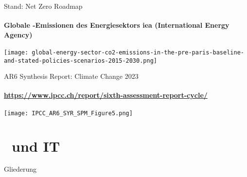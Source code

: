 		
\begin{frame}{Stand: Net Zero Roadmap}
	\framesubtitle{Globale \COz-Emissionen des Energiesektors \hspace*{\fill}
	                 iea (International Energy Agency)\cite{iea_net_zero2023}}
	
	
	\centering
	\texttt{[image: global-energy-sector-co2-emissions-in-the-pre-paris-baseline-and-stated-policies-scenarios-2015-2030.png]}\label{fig.iea_co_em}\infoAbb
	\end{frame}	
		
		
\begin{frame}{AR6 Synthesis Report: Climate Change 2023}
\framesubtitle{\hspace*{\fill} \href{https://www.ipcc.ch/report/sixth-assessment-report-cycle/}{\tiny https://www.ipcc.ch/report/sixth-assessment-report-cycle/} \cite{AR6_2024}}


		\centering\texttt{[image: IPCC\_AR6\_SYR\_SPM\_Figure5.png]}
		\label{fig.AR6_IPCC} \infoAbb

\end{frame}


\section{\COz \ und  IT}
\label{s.CO2_IT}

\begin{frame}{Gliederung}
\tableofcontents[currentsection]
\end{frame}

